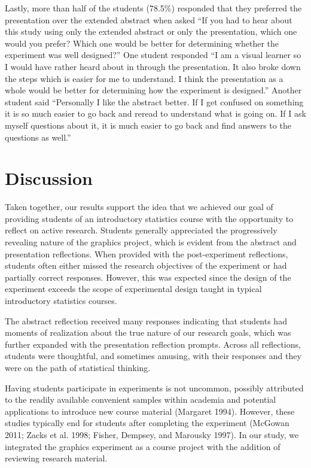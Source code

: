 \documentclass[
  12pt,
]{article}
\begin{document}
Lastly, more than half of the students (78.5\%) responded that they
preferred the presentation over the extended abstract when asked ``If
you had to hear about this study using only the extended abstract or
only the presentation, which one would you prefer? Which one would be
better for determining whether the experiment was well designed?'' One
student responded ``I am a visual learner so I would have rather heard
about in through the presentation. It also broke down the steps which is
easier for me to understand. I think the presentation as a whole would
be better for determining how the experiment is designed.'' Another
student said ``Personally I like the abstract better. If I get confused
on something it is so much easier to go back and reread to understand
what is going on. If I ask myself questions about it, it is much easier
to go back and find answers to the questions as well.''

\section{Discussion}\label{discussion}

Taken together, our results support the idea that we achieved our goal
of providing students of an introductory statistics course with the
opportunity to reflect on active research. Students generally
appreciated the progressively revealing nature of the graphics project,
which is evident from the abstract and presentation reflections. When
provided with the post-experiment reflections, students often either
missed the research objectives of the experiment or had partially
correct responses. However, this was expected since the design of the
experiment exceeds the scope of experimental design taught in typical
introductory statistics courses.

The abstract reflection received many responses indicating that students
had moments of realization about the true nature of our research goals,
which was further expanded with the presentation reflection prompts.
Across all reflections, students were thoughtful, and sometimes amusing,
with their responses and they were on the path of statistical thinking.

Having students participate in experiments is not uncommon, possibly
attributed to the readily available convenient samples within academia
and potential applications to introduce new course material (Margaret
1994). However, these studies typically end for students after
completing the experiment (McGowan 2011; Zacks et al. 1998; Fisher,
Dempsey, and Marousky 1997). In our study, we integrated the graphics
experiment as a course project with the addition of reviewing research
material.
\end{document}

